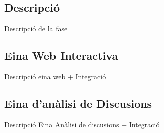 
\subsection{Descripció}
Descripció de la fase
\subsection{Eina Web Interactiva}
Descripció eina web + Integració
\subsection{Eina d'anàlisi de Discusions}
Descripció Eina Anàlisi de discusions + Integració
